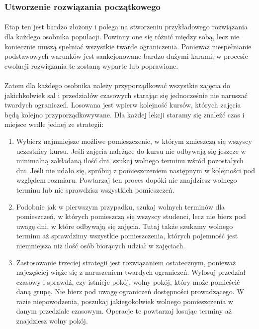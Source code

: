 \subsubsection{Utworzenie rozwiązania początkowego}
\paragraph{}Etap ten jest bardzo złożony i polega na stworzeniu przykładowego rozwiązania dla każdego osobnika populacji. Powinny one się różnić między sobą, lecz nie koniecznie muszą spełniać wszystkie twarde ograniczenia. Ponieważ niespełnianie podstawowych warunków jest sankcjonowane bardzo dużymi karami, w procesie ewolucji rozwiązania te zostaną wyparte lub poprawione.
\paragraph{}Zatem dla każdego osobnika należy przyporządkować wszystkie zajęcia do jakichkolwiek sal i przedziałów czasowych starając się jednocześnie nie naruszać twardych ograniczeń. Losowana jest wpierw kolejność kursów, których zajęcia będą kolejno przyporządkowywane. Dla każdej lekcji staramy się znaleźć czas i miejsce wedle jednej ze strategii:
\begin{enumerate}
\item Wybierz najmniejsze możliwe pomieszczenie, w którym zmieszczą się wszyscy uczestnicy kursu. Jeśli zajęcia należące do kursu nie odbywają się jeszcze w minimalną zakładaną ilość dni, szukaj wolnego terminu wśród pozostałych dni. Jeśli nie udało się, spróbuj z pomieszczeniem następnym w kolejności pod względem rozmiaru. Powtarzaj ten proces dopóki nie znajdziesz wolnego terminu lub nie sprawdzisz wszystkich pomieszczeń.
\item Podobnie jak w pierwszym przypadku, szukaj wolnych terminów dla pomieszczeń, w których pomieszczą się wszyscy studenci, lecz nie bierz pod uwagę dni, w które odbywają się zajęcia. Tutaj także szukamy wolnego terminu aż sprawdzimy wszystkie pomieszczenia, których pojemność jest niemniejsza niż ilość osób biorących udział w zajęciach.
\item Zastosowanie trzeciej strategii jest rozwiązaniem ostatecznym, ponieważ najczęściej wiąże się z naruszeniem twardych ograniczeń.  Wylosuj przedział czasowy i sprawdź, czy istnieje pokój, wolny pokój, który może pomieścić daną grupę. Nie bierz pod uwagę ograniczeń dostępności prowadzącego. W razie niepowodzenia, poszukaj jakiegokolwiek wolnego pomieszczenia w danym przedziale czasowym. Operacje te powtarzaj losując terminy aż znajdziesz wolny pokój.
\end{enumerate}
